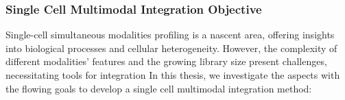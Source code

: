 
\subsubsection{Single Cell Multimodal Integration Objective}
Single-cell simultaneous modalities profiling is a nascent area, offering insights into biological processes and cellular heterogeneity. However, the complexity of different modalities' features and the growing library size present challenges, necessitating tools for integration In this thesis, we investigate the aspects with the flowing goals to develop a single cell multimodal integration method:


